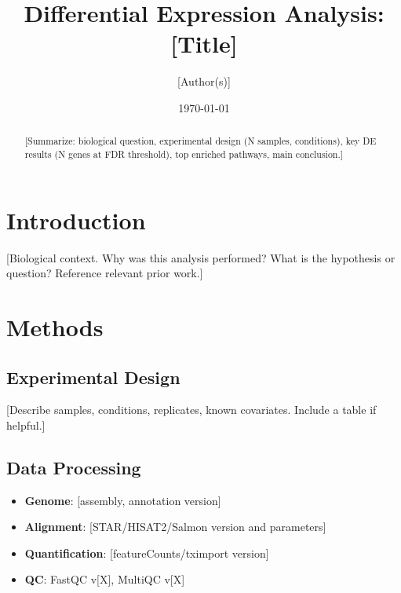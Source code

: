 \documentclass[11pt,a4paper]{article}
\title{Differential Expression Analysis: [Title]}
\author{[Author(s)]}
\date{\today}
\begin{document}
\maketitle

\begin{abstract}
[Summarize: biological question, experimental design (N samples, conditions),
key DE results (N genes at FDR threshold), top enriched pathways, main conclusion.]
\end{abstract}

\section{Introduction}

[Biological context. Why was this analysis performed? What is the hypothesis
or question? Reference relevant prior work.]

\section{Methods}

\subsection{Experimental Design}

[Describe samples, conditions, replicates, known covariates. Include a table
if helpful.]


\subsection{Data Processing}

\begin{itemize}
    \item \textbf{Genome}: [assembly, annotation version]
    \item \textbf{Alignment}: [STAR/HISAT2/Salmon version and parameters]
    \item \textbf{Quantification}: [featureCounts/tximport version]
    \item \textbf{QC}: FastQC v[X], MultiQC v[X]
\end{itemize}
\end{document}
